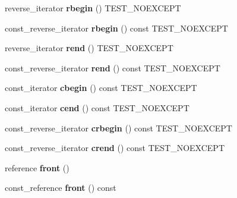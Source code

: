 \begin{DoxyCompactItemize}
\item 
\mbox{\label{classnasty__list_ab99dfc4ae25196ef7c9a808e816580a7}} 
reverse\+\_\+iterator {\bfseries rbegin} () T\+E\+S\+T\+\_\+\+N\+O\+E\+X\+C\+E\+PT
\item 
\mbox{\label{classnasty__list_a29fdc0f683497b4413410d5e4b3c586e}} 
const\+\_\+reverse\+\_\+iterator {\bfseries rbegin} () const T\+E\+S\+T\+\_\+\+N\+O\+E\+X\+C\+E\+PT
\item 
\mbox{\label{classnasty__list_a72974231985c4762a5da838189e44852}} 
reverse\+\_\+iterator {\bfseries rend} () T\+E\+S\+T\+\_\+\+N\+O\+E\+X\+C\+E\+PT
\item 
\mbox{\label{classnasty__list_a311f3f071b51e0a524c3bd6891b3233b}} 
const\+\_\+reverse\+\_\+iterator {\bfseries rend} () const T\+E\+S\+T\+\_\+\+N\+O\+E\+X\+C\+E\+PT
\item 
\mbox{\label{classnasty__list_a21c8e37dc9896fd1c83f8291d83e3592}} 
const\+\_\+iterator {\bfseries cbegin} () const T\+E\+S\+T\+\_\+\+N\+O\+E\+X\+C\+E\+PT
\item 
\mbox{\label{classnasty__list_a8b473bf1e80861a4df84afb46cd3ed24}} 
const\+\_\+iterator {\bfseries cend} () const T\+E\+S\+T\+\_\+\+N\+O\+E\+X\+C\+E\+PT
\item 
\mbox{\label{classnasty__list_a25840cc5620b859087f74aa9e1d2fe2b}} 
const\+\_\+reverse\+\_\+iterator {\bfseries crbegin} () const T\+E\+S\+T\+\_\+\+N\+O\+E\+X\+C\+E\+PT
\item 
\mbox{\label{classnasty__list_af1b46035bf4e2ba1fb6aff5245d8aada}} 
const\+\_\+reverse\+\_\+iterator {\bfseries crend} () const T\+E\+S\+T\+\_\+\+N\+O\+E\+X\+C\+E\+PT
\item 
\mbox{\label{classnasty__list_a9d107e24c072f5f8b049c5f43890ad7e}} 
reference {\bfseries front} ()
\item 
\mbox{\label{classnasty__list_a0ba1fd1f6d737e54e0feed72c990f35a}} 
const\+\_\+reference {\bfseries front} () const
\item 

\end{DoxyCompactItemize}
